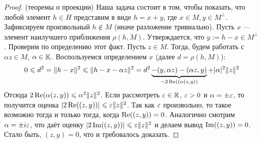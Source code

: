 \begin{proof} (теоремы о проекции)
	Наша задача состоит в том, чтобы показать, что любой элемент $h \in H$ представим в виде $h = x + y$, где $x \in M, y \in M^\bot$. Зафиксируем произвольный $h \notin M$ (иначе разложение тривиально). Пусть $x$ --- элемент наилучшего приближения $\rho(h, M)$.  Утверждается, что $y := h - x \in M^\bot$. Проверим по определению этот факт. Пусть $z \in M$. Тогда, будем работать с $\alpha z \in M$, $\alpha \in \mathbb{K}$. Воспользуемся определением $x$ (далее $d = \rho(h, M)$):
	\[
		0 \leqslant d^2 = \|h - x\|^2 \leqslant \|h - x - \alpha z\|^2 = d^2\underbrace{ - (y, \alpha z) - (\alpha z, y)}_{-2\operatorname{Re}((\alpha(z, y))} + |\alpha|^2\|z\|^2
	\]
	Отсюда $2\operatorname{Re}(\alpha(z, y)) \leqslant \alpha^2\|z\|^2$. Если рассмотреть $\varepsilon \in \mathbb{R}$, $\varepsilon > 0$ и $\alpha = \pm \varepsilon$, то получится оценка $|2 \operatorname{Re}((z, y))| \leqslant \varepsilon \|z\|^2$. Так как $\varepsilon$ произвольно, то такое возможно тогда и только тогда, когда $\operatorname{Re}((z, y)) = 0$. Аналогично смотрим $\alpha = \pm i\varepsilon$, что даёт оценку $|2\operatorname{Im}((z, y))| \leqslant \varepsilon \|z\|^2$ и делаем вывод $\operatorname{Im}((z, y)) = 0$. Стало быть, $(z, y) = 0$, что и требовалось доказать.
\end{proof}